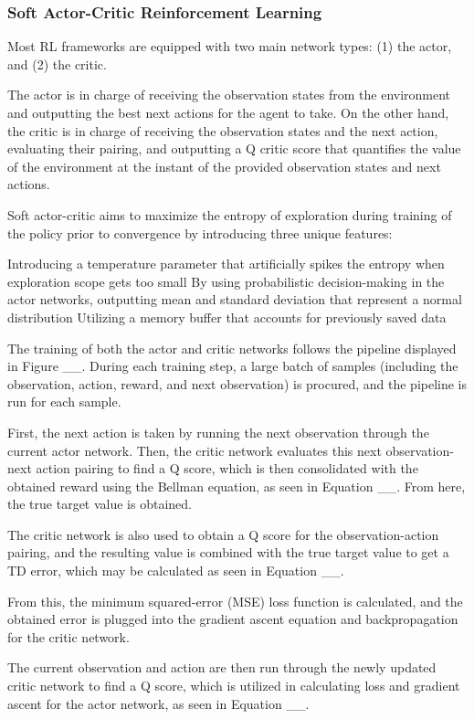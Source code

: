 \documentclass[12pt, a4paper]{report}
\begin{document}
\subsubsection{Soft Actor-Critic Reinforcement Learning}

Most RL frameworks are equipped with two main network types: (1) the actor, and (2) the critic. 

The actor is in charge of receiving the observation states from the environment and outputting the best next actions for the agent to take. On the other hand, the critic is in charge of receiving the observation states and the next action, evaluating their pairing, and outputting a Q critic score that quantifies the value of the environment at the instant of the provided observation states and next actions.

Soft actor-critic aims to maximize the entropy of exploration during training of the policy prior to convergence by introducing three unique features:

Introducing a temperature parameter that artificially spikes the entropy when exploration scope gets too small
By using probabilistic decision-making in the actor networks, outputting mean and standard deviation that represent a normal distribution
Utilizing a memory buffer that accounts for previously saved data

The training of both the actor and critic networks follows the pipeline displayed in Figure __. During each training step, a large batch of samples (including the observation, action, reward, and next observation) is procured, and the pipeline is run for each sample.

First, the next action is taken by running the next observation through the current actor network. Then, the critic network evaluates this next observation-next action pairing to find a Q score, which is then consolidated with the obtained reward using the Bellman equation, as seen in Equation __. From here, the true target value is obtained.


The critic network is also used to obtain a Q score for the observation-action pairing, and the resulting value is combined with the true target value to get a TD error, which may be calculated as seen in Equation __.


From this, the minimum squared-error (MSE) loss function is calculated, and the obtained error is plugged into the gradient ascent equation and backpropagation for the critic network.

The current observation and action are then run through the newly updated critic network to find a Q score, which is utilized in calculating loss and gradient ascent for the actor network, as seen in Equation __.
\end{document}
